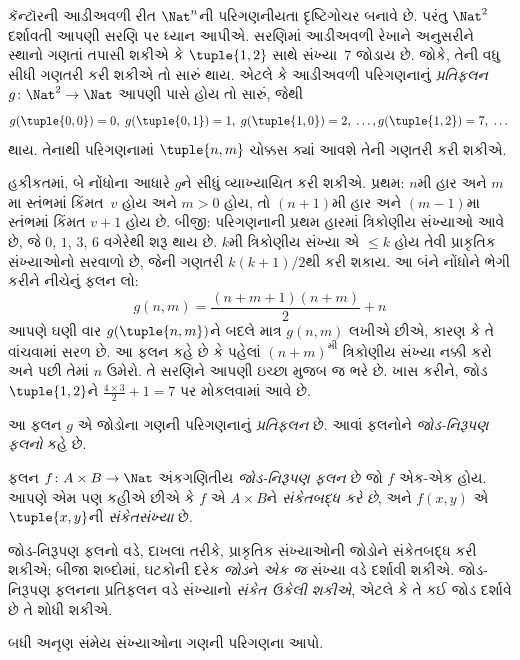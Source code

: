 \documentclass[../../../include/open-logic-section]{subfiles}
\begin{document}

\begin{explain}
કૅન્ટૉરની આડીઅવળી રીત $\Nat^n$ની પરિગણનીયતા દૃષ્ટિગોચર
બનાવે છે. પરંતુ $\Nat^2$ દર્શાવતી આપણી સરણિ પર
ધ્યાન આપીએ. સરણિમાં આડીઅવળી રેખાને અનુસરીને સ્થાનો
ગણતાં તપાસી શકીએ કે $\tuple{1,2}$ સાથે સંખ્યા~$7$
જોડાય છે. જોકે, તેની વધુ સીધી ગણતરી કરી શકીએ તો
સારું થાય. એટલે કે આડીઅવળી પરિગણનાનું
\emph{પ્રતિફલન} $g\colon \Nat^2 \to \Nat$
આપણી પાસે હોય તો સારું, જેથી
\[
g(\tuple{0,0}) = 0, \;
g(\tuple{0,1}) = 1, \;
g(\tuple{1,0}) = 2, \; \dots,
g(\tuple{1,2}) = 7, \; \dots
\]
થાય. તેનાથી પરિગણનામાં $\tuple{n, m}$ ચોક્કસ
ક્યાં આવશે તેની ગણતરી કરી શકીએ.

હકીકતમાં, બે નોંધોના આધારે $g$ને સીધું વ્યાખ્યાયિત
કરી શકીએ. પ્રથમ: $n$મી હાર અને $m$મા સ્તંભમાં
કિંમત~$v$ હોય અને $m>0$ હોય, તો $(n+1)$મી હાર અને $(m-1)$મા
સ્તંભમાં કિંમત $v + 1$ હોય છે. બીજી: પરિગણનાની
પ્રથમ હારમાં ત્રિકોણીય સંખ્યાઓ આવે છે, જે
$0$, $1$, $3$, $6$ વગેરેથી શરૂ થાય છે.
$k$મી ત્રિકોણીય સંખ્યા એ $\leq k$ હોય તેવી પ્રાકૃતિક
સંખ્યાઓનો સરવાળો છે, જેની ગણતરી $k(k+1)/2$થી
કરી શકાય.
આ બંને નોંધોને ભેગી કરીને નીચેનું ફલન લો:
\[
  g(n,m) = \frac{(n+m+1)(n+m)}{2} + n
\]
આપણે ઘણી વાર $g(\tuple{n, m})$ને બદલે માત્ર
$g(n, m)$ લખીએ છીએ, કારણ કે તે વાંચવામાં સરળ છે.
આ ફલન કહે છે કે પહેલાં $(n+m)^\text{મી}$
ત્રિકોણીય સંખ્યા નક્કી કરો અને પછી તેમાં $n$ ઉમેરો.
તે સરણિને આપણી ઇચ્છા મુજબ જ ભરે છે.
ખાસ કરીને, જોડ $\tuple{1, 2}$ને
$\frac{4 \times 3}{2} +
1 = 7$ પર મોકલવામાં આવે છે.

આ ફલન $g$ એ જોડોના ગણની પરિગણનાનું
\emph{પ્રતિફલન} છે. આવાં ફલનોને
\emph{જોડ-નિરૂપણ ફલનો} કહે છે.
\end{explain}

\begin{defn}[જોડ-નિરૂપણ ફલન]
ફલન $f\colon A \times B \to \Nat$ અંકગણિતીય
\emph{જોડ-નિરૂપણ ફલન} છે જો $f$ એક-એક હોય.
આપણે એમ પણ કહીએ છીએ કે $f$ એ $A \times B$ને
\emph{સંકેતબદ્ધ કરે છે}, અને $f(x,y)$ એ
$\tuple{x,y}$ની \emph{સંકેતસંખ્યા} છે.
\end{defn}

\begin{explain}
જોડ-નિરૂપણ ફલનો વડે, દાખલા તરીકે, પ્રાકૃતિક
સંખ્યાઓની જોડોને સંકેતબદ્ધ કરી શકીએ; બીજા શબ્દોમાં,
ઘટકોની દરેક \emph{જોડ}ને \emph{એક જ} સંખ્યા વડે
દર્શાવી શકીએ. જોડ-નિરૂપણ ફલનના પ્રતિફલન વડે
સંખ્યાનો \emph{સંકેત ઉકેલી શકીએ}, એટલે કે તે
કઈ જોડ દર્શાવે છે તે શોધી શકીએ.
\end{explain}

\begin{prob}
બધી અનૃણ સંમેય સંખ્યાઓના ગણની પરિગણના આપો.
\end{prob}
\end{document}
